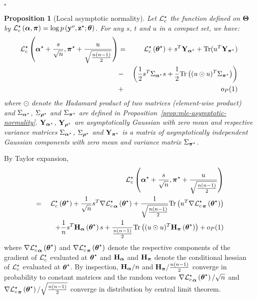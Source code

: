 \documentclass[]{imsart}
\newcommand{\1}{\mathds{1}}
\numberwithin{equation}{section}
\theoremstyle{plain}
\newtheorem{proposition}[thm]{Proposition}
\theoremstyle{remark}
\begin{document}
\begin{flushright}
$\square$
\end{flushright}

\begin{proposition}[Local asymptotic normality]\label{prop:LocalAsymp}
Let $\mathcal{L}_c^{\star}$ the function defined on $\boldsymbol{\Theta}$ by $\mathcal{L}_c^{\star}\left(\boldsymbol{\alpha},\boldsymbol{\pi}\right)=\log p\left(\mathbf{y}^o,\mathbf{z}^\star;\boldsymbol{\theta}\right)$. For any $s$, $t$ and $u$ in a compact set, we have:
\begin{eqnarray*}
\Lcs\left(\bpis+\frac{s}{\sqrt{\n}},\bals+\frac{u}{\sqrt{\frac{\n(\n-1)}{2}}}\right)
&=&\Lcs\left(\bthetas\right) + s\transpose\bY_{\bpis}+ \text{Tr}(u\transpose\bY_{\bals})\\
& -&\left(\frac{1}{2}s\transpose\Sig_{\bpis}s+\frac{1}{2} \text{Tr}\left((u \odot u)\transpose\Sig_{\bals}\right)\right)\\
&+&o_{P}(1)\\
\end{eqnarray*}
where $\odot$ denote the Hadamard product of two matrices (element-wise product) and $\Sigma_{\boldsymbol{\alpha}^\star}$, $\Sigma_{\boldsymbol{\rho}^\star}$ and $\Sigma_{\boldsymbol{\pi}^\star}$ are defined in Proposition~\ref{prop:mle-asymptotic-normality}. $\mathbf{Y}_{\boldsymbol{\alpha}^\star}$, $\mathbf{Y}_{\boldsymbol{\rho}^\star}$ are asymptotically Gaussian with zero mean and respective variance matrices $\Sigma_{\boldsymbol{\alpha}^\star}$, $\Sigma_{\boldsymbol{\rho}^\star}$ and $\mathbf{Y}_{\boldsymbol{\pi}^\star}$ is a matrix of asymptotically independent Gaussian components with zero mean and variance matrix $\Sigma_{\boldsymbol{\pi}^\star}$.
\end{proposition}
\proofbegin
By Taylor expansion,
\begin{eqnarray*}
& &\!\!\!\!\!\!\!\!\!\!\Lcs\left(\bpis+\frac{s}{\sqrt{\n}},\bals+\frac{u}{\sqrt{\frac{\n(\n-1)}{2}}}\right)\\
&=&\Lcs\left(\bthetas\right)+\frac{1}{\sqrt{\n}}s\transpose\nabla{\Lcs}_{\bpi}\left(\bthetas\right) +\frac{1}{\sqrt{\frac{\n(\n-1)}{2}}}\text{Tr}\left(u\transpose\nabla{\Lcs}_{\bal}\left(\bthetas\right)\right)\\
&&\quad+\frac{1}{\n}s\transpose\bH_{\bpi}\left(\bthetas\right)s+\frac{1}{\frac{\n(\n-1)}{2}}\text{Tr}\left((u \odot u)\transpose\bH_{\bal}\left(\bthetas\right)\right)+o_{P}(1)\\
\end{eqnarray*}
where $\nabla{\mathcal{L}_c^{\star}}_{\boldsymbol{\alpha}}\left(\boldsymbol{\theta}^\star\right)$ and $\nabla{\mathcal{L}_c^{\star}}_{\boldsymbol{\pi}}\left(\boldsymbol{\theta}^\star\right)$ denote the respective components of the gradient of $\mathcal{L}_c^{\star}$ evaluated at $\boldsymbol{\theta}^\star$ and $\mathbf{H}_{\boldsymbol{\alpha}}$ and $\mathbf{H}_{\boldsymbol{\pi}}$ denote the conditional hessian of $\mathcal{L}_c^{\star}$ evaluated at $\boldsymbol{\theta}^\star$. By inspection, $\mathbf{H}_{\boldsymbol{\alpha}}/n$ and $\mathbf{H}_{\boldsymbol{\pi}}/\frac{n(n-1)}{2}$ converge in probability to constant matrices and the random vectors $\nabla{\mathcal{L}_c^{\star}}_{\boldsymbol{\alpha}}\left(\boldsymbol{\theta}^\star\right)/\sqrt{n}$ and $\nabla{\mathcal{L}_c^{\star}}_{\boldsymbol{\pi}}\left(\boldsymbol{\theta}^\star\right)/\sqrt{\frac{n(n-1)}{2}}$ converge in distribution by central limit theorem. %
\proofend
\end{document}
